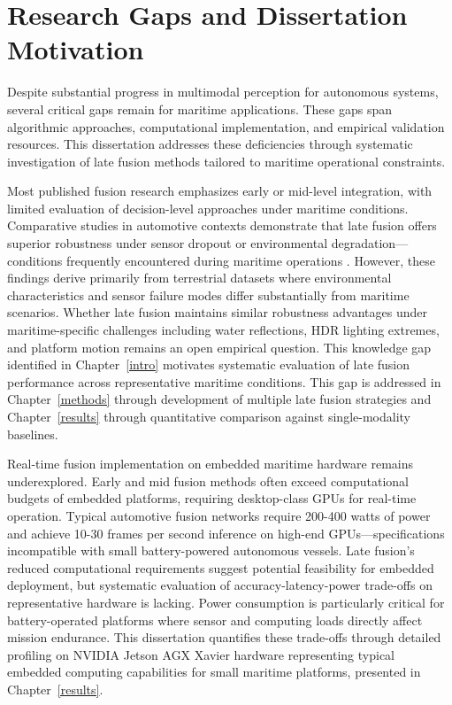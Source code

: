 \documentclass[../main.tex]{subfiles}
\begin{document}
\section{Research Gaps and Dissertation Motivation}

Despite substantial progress in multimodal perception for autonomous systems, several critical gaps remain for maritime applications. These gaps span algorithmic approaches, computational implementation, and empirical validation resources. This dissertation addresses these deficiencies through systematic investigation of late fusion methods tailored to maritime operational constraints.

Most published fusion research emphasizes early or mid-level integration, with limited evaluation of decision-level approaches under maritime conditions. Comparative studies in automotive contexts demonstrate that late fusion offers superior robustness under sensor dropout or environmental degradation—conditions frequently encountered during maritime operations \cite{huang2024a, wang2020a}. However, these findings derive primarily from terrestrial datasets where environmental characteristics and sensor failure modes differ substantially from maritime scenarios. Whether late fusion maintains similar robustness advantages under maritime-specific challenges including water reflections, HDR lighting extremes, and platform motion remains an open empirical question. This knowledge gap identified in Chapter~\ref{intro} motivates systematic evaluation of late fusion performance across representative maritime conditions. This gap is addressed in Chapter~\ref{methods} through development of multiple late fusion strategies and Chapter~\ref{results} through quantitative comparison against single-modality baselines.

Real-time fusion implementation on embedded maritime hardware remains underexplored. Early and mid fusion methods often exceed computational budgets of embedded platforms, requiring desktop-class GPUs for real-time operation. Typical automotive fusion networks require 200-400 watts of power and achieve 10-30 frames per second inference on high-end GPUs—specifications incompatible with small battery-powered autonomous vessels. Late fusion's reduced computational requirements suggest potential feasibility for embedded deployment, but systematic evaluation of accuracy-latency-power trade-offs on representative hardware is lacking. Power consumption is particularly critical for battery-operated platforms where sensor and computing loads directly affect mission endurance. This dissertation quantifies these trade-offs through detailed profiling on NVIDIA Jetson AGX Xavier hardware representing typical embedded computing capabilities for small maritime platforms, presented in Chapter~\ref{results}.
\end{document}
